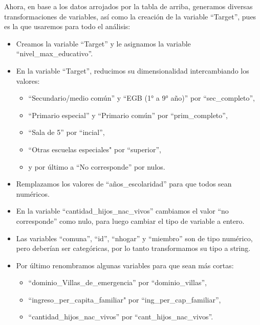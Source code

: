 \documentclass[a4paper]{article}
\begin{document}
    Ahora, en base a los datos arrojados por la tabla de arriba, generamos diversas transformaciones de variables, así como la creación de la variable ``Target'', pues es la que usaremos para todo el análisis:
    \begin{itemize}
        \item Creamos la variable ``Target'' y le asignamos la variable ``nivel\_max\_educativo''.
        \item En la variable ``Target'', reducimos su dimensionalidad intercambiando los valores:
            \begin{itemize}
                \item ``Secundario/medio común'' y ``EGB (1° a 9° año)'' por ``sec\_completo'',
                \item ``Primario especial'' y ``Primario común'' por ``prim\_completo'',
                \item ``Sala de 5'' por ``incial'',
                \item ``Otras escuelas especiales" por ``superior'',
                \item y por último a ``No corresponde'' por nulos.
            \end{itemize}
        \item Remplazamos los valores de ``años\_escolaridad'' para que todos sean numéricos.
        \item En la variable ``cantidad\_hijos\_nac\_vivos'' cambiamos el valor ``no corresponde'' como nulo, para luego cambiar el tipo de variable a entero.
        \item Las variables ``comuna'', ``id'', ``nhogar'' y ``miembro'' son de tipo numérico, pero deberían ser categóricas, por lo tanto transformamos su tipo a string.
        \item Por último renombramos algunas variables para que sean más cortas:
            \begin{itemize}
                \item ``dominio\_Villas\_de\_emergencia'' por ``dominio\_villas'',
                \item ``ingreso\_per\_capita\_familiar" por ``ing\_per\_cap\_familiar'',
                \item ``cantidad\_hijos\_nac\_vivos'' por ``cant\_hijos\_nac\_vivos''.
            \end{itemize}
    \end{itemize}
 
\end{document}
